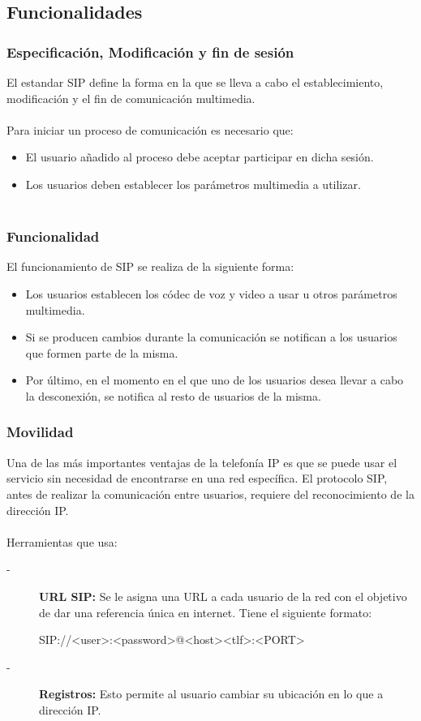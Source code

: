 \documentclass{beamer}
\begin{document}
\subsection{Funcionalidades}
\begin{frame}
\frametitle{Especificación, Modificación y fin de sesión}
El estandar SIP define la forma en la que se lleva a cabo el establecimiento, modificación y el fin de comunicación multimedia. \\~\\
Para iniciar un proceso de comunicación es necesario que:
		\begin{itemize}
			\item El usuario añadido al proceso debe aceptar participar en dicha sesión.
			\item Los usuarios deben establecer los parámetros multimedia a utilizar.\\~\\
		\end{itemize}	
\end{frame}
\begin{frame}
\frametitle{Funcionalidad}
		El funcionamiento de SIP se realiza de la siguiente forma:
		\begin{itemize}
			\item Los usuarios establecen los códec de voz y video a usar u otros parámetros multimedia.
			\item Si se producen cambios durante la comunicación se notifican a los usuarios que formen parte de la misma.
			\item Por último, en el momento en el que uno de los usuarios desea llevar a cabo la desconexión, se notifica al resto de usuarios de la misma.
		\end{itemize}
\end{frame}
\begin{frame}
\frametitle{Movilidad}
		Una de las más importantes ventajas de la telefonía IP es que se puede usar el servicio sin necesidad de encontrarse en una red específica. El protocolo SIP, antes de realizar la comunicación entre usuarios, requiere del reconocimiento de la dirección IP.\\~\\
	Herramientas que usa:
		\begin{description}
		\item[-]\textbf{URL SIP:} Se le asigna una URL a cada usuario de la red con el objetivo de dar una referencia única en internet. Tiene el siguiente formato:\\
		\begin{example}
		SIP://<user>:<password>@<host><tlf>:<PORT>
		\end{example}

		\item[-]\textbf{Registros:} Esto permite al usuario cambiar su ubicación en lo que a dirección IP.
		\end{description}
\end{frame}
\end{document}
